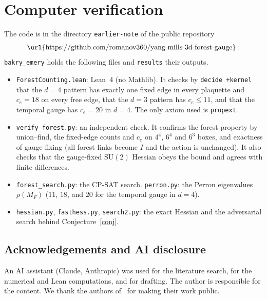 \documentclass[11pt]{amsart}
\theoremstyle{definition}
\theoremstyle{remark}
\newcommand{\SU}{\mathrm{SU}}
\begin{document}
\appendix
\section{Computer verification}\label{app:lean}
The code is in the directory \texttt{earlier-note} of the public repository
\[\text{\url{https://github.com/romanov360/yang-mills-3d-forest-gauge}}:\] \texttt{bakry\_emery} holds the following files and
\texttt{results} their outputs.
\begin{itemize}
\item \texttt{ForestCounting.lean}: Lean~4 (no Mathlib). It checks by \texttt{decide +kernel} that the $d=4$ pattern
has exactly one fixed edge in every plaquette and $c_e=18$ on every free edge, that the $d=3$ pattern has
$c_e\le11$, and that the temporal gauge has $c_e=20$ in $d=4$. The only axiom used is \texttt{propext}.
\item \texttt{verify\_forest.py}: an independent check. It confirms the forest property by union--find, the fixed-edge
counts and $c_e$ on $4^4$, $6^4$ and $6^3$ boxes, and exactness of gauge fixing (all forest links become $I$ and the
action is unchanged). It also checks that the gauge-fixed $\SU(2)$ Hessian obeys the bound and agrees with finite
differences.
\item \texttt{forest\_search.py}: the CP-SAT search. \texttt{perron.py}: the Perron eigenvalues $\rho(M_F)$ ($11$, $18$,
and $20$ for the temporal gauge in $d=4$).
\item \texttt{hessian.py}, \texttt{fasthess.py}, \texttt{search2.py}: the exact Hessian and the adversarial search
behind Conjecture~\ref{conj}.
\end{itemize}

\subsection*{Acknowledgements and AI disclosure}
An AI assistant (Claude, Anthropic) was used for the literature search, for the numerical and Lean computations, and
for drafting. The author is responsible for the content. We thank the authors of~\cite{BBL,BB-sharp} for making
their work public.
\end{document}
